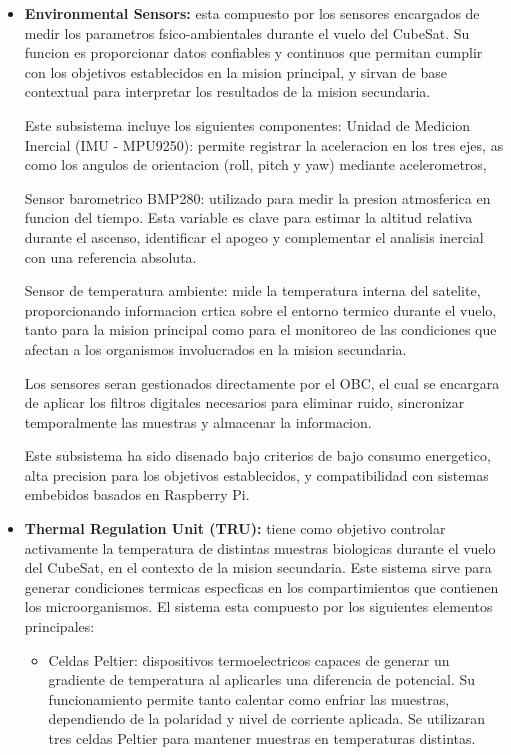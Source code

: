 \begin{itemize}
      \item \textbf{Environmental Sensors:} esta compuesto por los sensores encargados de medir los
        parametros fsico-ambientales durante el vuelo del CubeSat. Su funcion es proporcionar
        datos confiables y continuos que permitan cumplir con los objetivos establecidos en la
        mision principal, y sirvan de base contextual para interpretar los resultados de la mision
        secundaria.

        Este subsistema incluye los siguientes componentes:
        Unidad de Medicion Inercial (IMU - MPU9250): permite registrar la aceleracion en los
        tres ejes, as como los angulos de orientacion (roll, pitch y yaw) mediante acelerometros,

        Sensor barometrico BMP280: utilizado para medir la presion atmosferica en funcion
        del tiempo. Esta variable es clave para estimar la altitud relativa durante el ascenso,
        identificar el apogeo y complementar el analisis inercial con una referencia absoluta.

        Sensor de temperatura ambiente: mide la temperatura interna del satelite, proporcionando
        informacion crtica sobre el entorno termico durante el vuelo, tanto para la
        mision principal como para el monitoreo de las condiciones que afectan a los organismos
        involucrados en la mision secundaria.

        Los sensores seran gestionados directamente por el OBC, el cual se encargara de aplicar los
        filtros digitales necesarios para eliminar ruido, sincronizar temporalmente las
        muestras y almacenar la informacion.

        Este subsistema ha sido disenado bajo criterios de bajo consumo energetico, alta precision para
        los objetivos establecidos, y compatibilidad con sistemas embebidos basados
        en Raspberry Pi.

      \item \textbf{Thermal Regulation Unit (TRU):} tiene como objetivo controlar activamente la
        temperatura de distintas muestras biologicas durante el vuelo del CubeSat, en el contexto de la
        mision secundaria. Este sistema sirve para generar condiciones termicas
        especficas en los compartimientos que contienen los microorganismos.
        El sistema esta compuesto por los siguientes elementos principales:

      \begin{itemize}
        \item Celdas Peltier: dispositivos termoelectricos capaces de generar un gradiente de
          temperatura al aplicarles una diferencia de potencial. Su funcionamiento permite
          tanto calentar como enfriar las muestras, dependiendo de la polaridad y nivel de
          corriente aplicada. Se utilizaran tres celdas Peltier para mantener muestras en
          temperaturas distintas.


\end{itemize}
\end{itemize}
